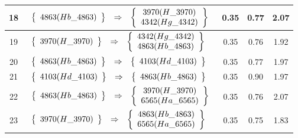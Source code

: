 \begin{longtable}{| c | l | c | c | c |}
18 & $\begin{array}{c c c}\left\{\begin{array}{c}4863 (Hb\_4863)\end{array}\right\} & \Rightarrow & \left\{\begin{array}{c}3970 (H\_3970) \\ 4342 (Hg\_4342)\end{array}\right\}\end{array}$ & 0.35 & 0.77 & 2.07 \\ \hline
19 & $\begin{array}{c c c}\left\{\begin{array}{c}3970 (H\_3970)\end{array}\right\} & \Rightarrow & \left\{\begin{array}{c}4342 (Hg\_4342) \\ 4863 (Hb\_4863)\end{array}\right\}\end{array}$ & 0.35 & 0.76 & 1.92 \\ \hline
20 & $\begin{array}{c c c}\left\{\begin{array}{c}4863 (Hb\_4863)\end{array}\right\} & \Rightarrow & \left\{\begin{array}{c}4103 (Hd\_4103)\end{array}\right\}\end{array}$ & 0.35 & 0.77 & 1.97 \\ \hline
21 & $\begin{array}{c c c}\left\{\begin{array}{c}4103 (Hd\_4103)\end{array}\right\} & \Rightarrow & \left\{\begin{array}{c}4863 (Hb\_4863)\end{array}\right\}\end{array}$ & 0.35 & 0.90 & 1.97 \\ \hline
22 & $\begin{array}{c c c}\left\{\begin{array}{c}4863 (Hb\_4863)\end{array}\right\} & \Rightarrow & \left\{\begin{array}{c}3970 (H\_3970) \\ 6565 (Ha\_6565)\end{array}\right\}\end{array}$ & 0.35 & 0.76 & 2.07 \\ \hline
23 & $\begin{array}{c c c}\left\{\begin{array}{c}3970 (H\_3970)\end{array}\right\} & \Rightarrow & \left\{\begin{array}{c}4863 (Hb\_4863) \\ 6565 (Ha\_6565)\end{array}\right\}\end{array}$ & 0.35 & 0.75 & 1.83 \\ \hline

\end{longtable}
